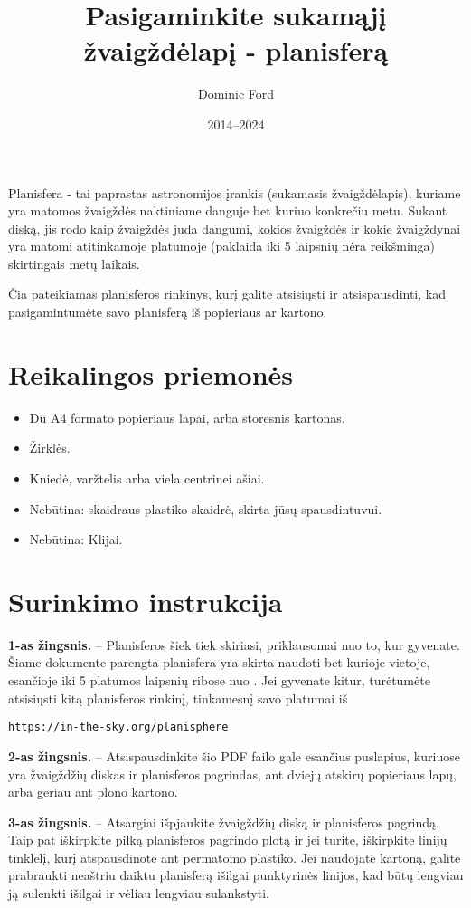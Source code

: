\documentclass[a4paper,onecolumn,10pt]{article}
\title{Pasigaminkite sukamąjį žvaigždėlapį - planisferą}
\author{Dominic Ford}
\date{2014--2024}
\begin{document}
\maketitle
\setcounter{footnote}{1}

Planisfera - tai paprastas astronomijos įrankis (sukamasis žvaigždėlapis), kuriame yra
matomos žvaigždės naktiniame danguje bet kuriuo konkrečiu metu. Sukant diską, jis rodo
kaip žvaigždės juda dangumi, kokios žvaigždės ir
kokie žvaigždynai yra matomi atitinkamoje platumoje (paklaida iki 5 laipsnių nėra reikšminga) skirtingais metų laikais.

Čia pateikiamas planisferos rinkinys, kurį galite atsisiųsti ir atsispausdinti, kad pasigamintumėte savo planisferą iš popieriaus ar kartono.

\section*{Reikalingos priemonės}

\begin{itemize}
\item Du A4 formato popieriaus lapai, arba storesnis kartonas.
\item Žirklės.
\item Kniedė, varžtelis arba viela centrinei ašiai.
\item Nebūtina: skaidraus plastiko skaidrė, skirta jūsų spausdintuvui.
\item Nebūtina: Klijai.
\end{itemize}

\section*{Surinkimo instrukcija}

{\bf 1-as žingsnis.} -- Planisferos šiek tiek skiriasi, priklausomai nuo to, kur
gyvenate. Šiame dokumente parengta planisfera yra skirta naudoti bet kurioje vietoje, esančioje iki 5 platumos laipsnių ribose nuo . Jei gyvenate
kitur, turėtumėte atsisiųsti kitą planisferos rinkinį, tinkamesnį savo platumai iš

\centerline{\tt https://in-the-sky.org/planisphere}

{\bf 2-as žingsnis.} -- Atsispausdinkite šio PDF failo gale esančius puslapius, kuriuose
yra žvaigždžių diskas ir planisferos pagrindas, ant dviejų atskirų popieriaus lapų,
arba geriau ant plono kartono.

{\bf 3-as žingsnis.} -- Atsargiai išpjaukite žvaigždžių diską ir
planisferos pagrindą. Taip pat iškirpkite pilką planisferos pagrindo plotą ir
jei turite, iškirpkite linijų tinklelį, kurį atspausdinote ant permatomo
plastiko. Jei naudojate kartoną, galite prabraukti neaštriu
daiktu planisferą išilgai punktyrinės linijos, kad būtų lengviau ją sulenkti išilgai ir
vėliau lengviau sulankstyti.
\end{document}
